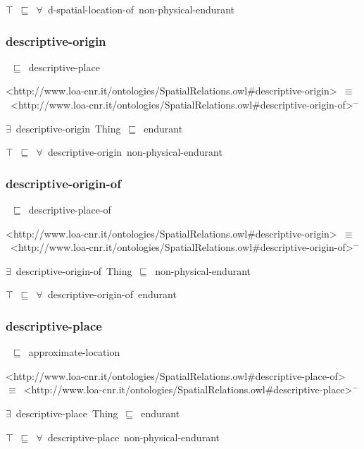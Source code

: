 \documentclass{article}
\begin{document}
\ensuremath{\top}~\ensuremath{\sqsubseteq}~\ensuremath{\forall}~d-spatial-location-of~non-physical-endurant

\subsubsection*{descriptive-origin}

~\ensuremath{\sqsubseteq}~descriptive-place

<http://www.loa-cnr.it/ontologies/SpatialRelations.owl#descriptive-origin>~\ensuremath{\equiv}~<http://www.loa-cnr.it/ontologies/SpatialRelations.owl#descriptive-origin-of>\ensuremath{^-}

\ensuremath{\exists}~descriptive-origin~Thing~\ensuremath{\sqsubseteq}~endurant

\ensuremath{\top}~\ensuremath{\sqsubseteq}~\ensuremath{\forall}~descriptive-origin~non-physical-endurant

\subsubsection*{descriptive-origin-of}

~\ensuremath{\sqsubseteq}~descriptive-place-of

<http://www.loa-cnr.it/ontologies/SpatialRelations.owl#descriptive-origin>~\ensuremath{\equiv}~<http://www.loa-cnr.it/ontologies/SpatialRelations.owl#descriptive-origin-of>\ensuremath{^-}

\ensuremath{\exists}~descriptive-origin-of~Thing~\ensuremath{\sqsubseteq}~non-physical-endurant

\ensuremath{\top}~\ensuremath{\sqsubseteq}~\ensuremath{\forall}~descriptive-origin-of~endurant

\subsubsection*{descriptive-place}

~\ensuremath{\sqsubseteq}~approximate-location

<http://www.loa-cnr.it/ontologies/SpatialRelations.owl#descriptive-place-of>~\ensuremath{\equiv}~<http://www.loa-cnr.it/ontologies/SpatialRelations.owl#descriptive-place>\ensuremath{^-}

\ensuremath{\exists}~descriptive-place~Thing~\ensuremath{\sqsubseteq}~endurant

\ensuremath{\top}~\ensuremath{\sqsubseteq}~\ensuremath{\forall}~descriptive-place~non-physical-endurant
\end{document}

